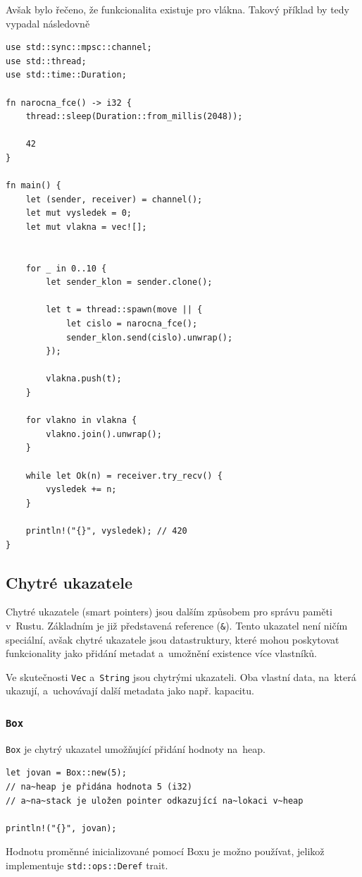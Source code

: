 \documentclass[a4paper, 12pt, twoside]{article} %
\newcommand{\rust}[1]{\texttt{#1}}
\begin{document}
			Avšak bylo řečeno, že funkcionalita existuje pro vlákna. Takový příklad by tedy vypadal následovně
			\begin{verbatim}
use std::sync::mpsc::channel;
use std::thread;
use std::time::Duration;

fn narocna_fce() -> i32 {
	thread::sleep(Duration::from_millis(2048));

	42
} 

fn main() {
	let (sender, receiver) = channel();
	let mut vysledek = 0;
	let mut vlakna = vec![];


	for _ in 0..10 {
		let sender_klon = sender.clone();

		let t = thread::spawn(move || {
			let cislo = narocna_fce();
			sender_klon.send(cislo).unwrap();
		});

		vlakna.push(t);
	}
	
	for vlakno in vlakna {
		vlakno.join().unwrap();
	}
	
	while let Ok(n) = receiver.try_recv() {
		vysledek += n;
	}

	println!("{}", vysledek); // 420
}
			\end{verbatim}
			\cite{kanaly}


	\subsection{Chytré ukazatele}
		Chytré ukazatele (smart pointers) jsou dalším způsobem pro správu paměti v~Rustu. Základním je již představená reference (\rust{&}). Tento ukazatel není ničím speciální, avšak chytré ukazatele jsou datastruktury, které mohou poskytovat funkcionality jako přidání metadat a~umožnění existence více vlastníků.
		
		Ve skutečnosti \rust{Vec} a~\rust{String} jsou chytrými ukazateli. Oba vlastní data, na~která ukazují, a~uchovávají další metadata jako např. kapacitu.
		
		\subsubsection*{\rust{Box}}
			\rust{Box} je chytrý ukazatel umožňující přidání hodnoty na~heap.
			\begin{verbatim}
let jovan = Box::new(5);
// na~heap je přidána hodnota 5 (i32)
// a~na~stack je uložen pointer odkazující na~lokaci v~heap

println!("{}", jovan);
			\end{verbatim}
			
			Hodnotu proměnné inicializované pomocí Boxu je možno používat, jelikož implementuje \rust{std::ops::Deref} trait.
			
\end{document}
